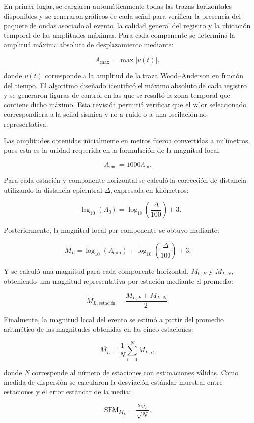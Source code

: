 \documentclass[a4paper,12pt]{article} %
\numberwithin{equation}{section} %
\numberwithin{figure}{section} %
\begin{document}
En primer lugar, se cargaron automáticamente todas las trazas horizontales disponibles y se generaron gráficos de cada señal para verificar la presencia del paquete de ondas asociado al evento, la calidad general del registro y la ubicación temporal de las amplitudes máximas. Para cada componente se determinó la amplitud máxima absoluta de desplazamiento mediante:

\[
A_{\max} = \max \left|u(t)\right|,
\]

donde \(u(t)\) corresponde a la amplitud de la traza Wood--Anderson en función del tiempo.
El algoritmo diseñado identificó el máximo absoluto de cada registro y se generaron figuras de control en las que se resaltó la zona temporal que contiene dicho máximo. Esta revisión permitió verificar que el valor seleccionado correspondiera a la señal sísmica y no a ruido o a una oscilación no representativa.

Las amplitudes obtenidas inicialmente en metros fueron convertidas a milímetros, pues esta es la unidad requerida en la formulación de la magnitud local:

\[
A_{\mathrm{mm}} = 1000 A_{\mathrm{m}}.
\]

Para cada estación y componente horizontal se calculó la corrección de distancia utilizando la distancia epicentral \(\Delta\), expresada en kilómetros:

\[
-\log_{10}(A_0) =
\log_{10}\left(\frac{\Delta}{100}\right)+3.
\]

Posteriormente, la magnitud local por componente se obtuvo mediante:

\[
M_L =
\log_{10}\left(A_{\mathrm{mm}}\right)
+
\log_{10}\left(\frac{\Delta}{100}\right)
+
3.
\]

Y se calculó una magnitud para cada componente horizontal, \(M_{L,E}\) y \(M_{L,N}\), obteniendo una magnitud representativa por estación mediante el promedio:

\[
M_{L,\mathrm{estación}} =
\frac{M_{L,E}+M_{L,N}}{2}.
\]

Finalmente, la magnitud local del evento se estimó a partir del promedio aritmético de las magnitudes obtenidas en las cinco estaciones:

\[
\overline{M_L} =
\frac{1}{N}
\sum_{i=1}^{N}M_{L,i},
\]

donde \(N\) corresponde al número de estaciones con estimaciones válidas. Como medida de dispersión se calcularon la desviación estándar muestral entre estaciones y el error estándar de la media:

\[
\mathrm{SEM}_{M_L} =
\frac{s_{M_L}}{\sqrt{N}}.
\]
\end{document}

